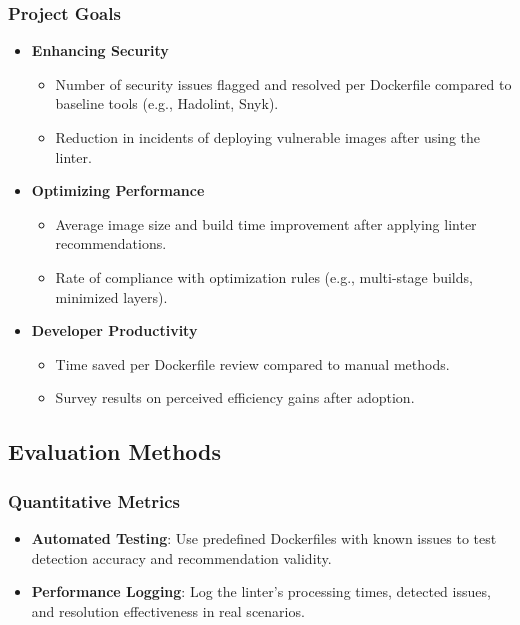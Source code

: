 \subsubsection{Project Goals}
\begin{itemize}
    \item \textbf{Enhancing Security}
    \begin{itemize}
        \item Number of security issues flagged and resolved per Dockerfile compared to baseline tools (e.g., Hadolint, Snyk).
        \item Reduction in incidents of deploying vulnerable images after using the linter.
    \end{itemize}

    \item \textbf{Optimizing Performance}
    \begin{itemize}
        \item Average image size and build time improvement after applying linter recommendations.
        \item Rate of compliance with optimization rules (e.g., multi-stage builds, minimized layers).
    \end{itemize}

    \item \textbf{Developer Productivity}
    \begin{itemize}
        \item Time saved per Dockerfile review compared to manual methods.
        \item Survey results on perceived efficiency gains after adoption.
    \end{itemize}
\end{itemize}

\subsection{Evaluation Methods}
\subsubsection{Quantitative Metrics}
\begin{itemize}
    \item \textbf{Automated Testing}: Use predefined Dockerfiles with known issues to test detection accuracy and recommendation validity.
    \item \textbf{Performance Logging}: Log the linter's processing times, detected issues, and resolution effectiveness in real scenarios.
\end{itemize}

